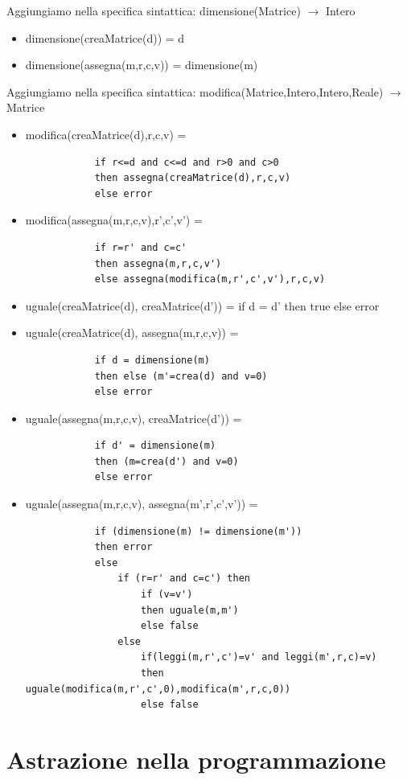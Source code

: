 \documentclass{article}
\begin{document}
	Aggiungiamo nella specifica sintattica: dimensione(Matrice) $\rightarrow$ Intero
	\begin{itemize}
		\item dimensione(creaMatrice(d)) = d
		\item dimensione(assegna(m,r,c,v)) = dimensione(m)
	\end{itemize}
	Aggiungiamo nella specifica sintattica: modifica(Matrice,Intero,Intero,Reale) $\rightarrow$ Matrice
	\begin{itemize}
		\item modifica(creaMatrice(d),r,c,v) =
		\begin{verbatim}
			if r<=d and c<=d and r>0 and c>0 
			then assegna(creaMatrice(d),r,c,v)
			else error
		\end{verbatim} 
        \item modifica(assegna(m,r,c,v),r',c',v') = 
		\begin{verbatim}	
			if r=r' and c=c'
			then assegna(m,r,c,v')
			else assegna(modifica(m,r',c',v'),r,c,v)
		\end{verbatim}
		\item uguale(creaMatrice(d), creaMatrice(d')) = if d = d' then true else error
		\item uguale(creaMatrice(d), assegna(m,r,c,v)) = 
		\begin{verbatim}
			if d = dimensione(m) 
			then else (m'=crea(d) and v=0) 
			else error
		\end{verbatim}
		\item uguale(assegna(m,r,c,v), creaMatrice(d')) = 
		\begin{verbatim}
			if d' = dimensione(m) 
			then (m=crea(d') and v=0)
			else error 
		\end{verbatim}
		\item uguale(assegna(m,r,c,v), assegna(m',r',c',v')) = 
		\begin{verbatim}
			if (dimensione(m) != dimensione(m')) 
			then error 
			else 
				if (r=r' and c=c') then 
					if (v=v') 
					then uguale(m,m') 
					else false
				else 
					if(leggi(m,r',c')=v' and leggi(m',r,c)=v) 
					then uguale(modifica(m,r',c',0),modifica(m',r,c,0))
					else false
		\end{verbatim}
	\end{itemize}

	\newpage
	\section{Astrazione nella programmazione}
\end{document}
